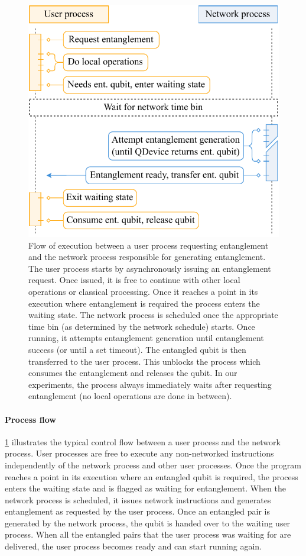 \begin{figure}
\centering
\includegraphics[width=\linewidth]{figures/qnodeos/supplementary/process-flow.pdf}
\caption{Flow of execution between a user process requesting entanglement and the network process responsible for generating entanglement. The user process starts by asynchronously issuing an entanglement request. Once issued, it is free to continue with other local operations or classical processing. Once it reaches a point in its execution where entanglement is required the process enters the waiting state. The network process is scheduled once the appropriate time bin (as determined by the network schedule) starts. Once running, it attempts entanglement generation until entanglement success (or until a set timeout). The entangled qubit is then transferred to the user process. This unblocks the process which consumes the entanglement and releases the qubit. In our experiments, the process always immediately waits after requesting entanglement (no local operations are done in between).}
\label{fig:process-flow}
\end{figure}

\paragraph{Process flow}

\cref{fig:process-flow} illustrates the typical control flow between a user process and the network process. User processes are free to execute any non-networked instructions independently of the network process and other user processes. Once the program reaches a point in its execution where an entangled qubit is required, the process enters the waiting state and is flagged as waiting for entanglement. When the network process is scheduled, it issues network instructions and generates entanglement as requested by the user process. Once an entangled pair is generated by the network process, the qubit is handed over to the waiting user process. When all the entangled pairs that the user process was waiting for are delivered, the user process becomes ready and can start running again.

